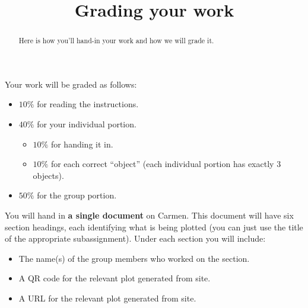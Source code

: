 \documentclass{ximera}
\title{Grading your work}
\begin{document}
\begin{abstract}
  Here is how you'll hand-in your work and how we will grade it.
\end{abstract}
\maketitle

Your work will be graded as follows:

\begin{itemize}
\item $10\%$ for reading the instructions.
\item $40\%$ for your individual portion.
  \begin{itemize}
  \item $10\%$ for handing it in.
  \item $10\%$ for each correct ``object'' (each individual portion has exactly $3$ objects).
  \end{itemize}
\item $50\%$ for the group portion.
\end{itemize}

You will hand in \textbf{a single document} on Carmen. This document
will have six section headings, each identifying what is being plotted
(you can just use the title of the appropriate subassignment).  Under
each section you will include:
\begin{itemize}
\item The name(s) of the group members who worked on the section.
\item A QR code for the relevant plot generated from
   site.
\item A URL for the relevant plot generated from
   site.
\end{itemize}
\end{document}
